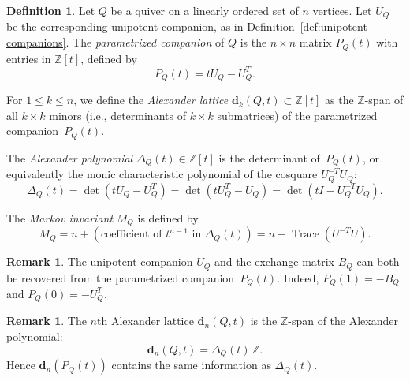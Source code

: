 \documentclass[11pt, letterpaper]{amsart}
\theoremstyle{definition}
\newtheorem{remark}[theorem]{Remark}
\newtheorem{definition}[theorem]{Definition}
\numberwithin{equation}{section}
\def\ZZ{{\mathbb Z}}
\def\dd{{\mathbf{d}}}
\begin{document}
\begin{definition}
\label{def:Ut}
Let $Q$ be a quiver on a linearly ordered set of $n$ vertices.
Let $U_Q$ be the corresponding unipotent companion, as in Definition~\ref{def:unipotent companions}. \linebreak[3]
The \emph{parametrized companion} of $Q$ is the $n \times n$ matrix $P_Q(t)$ 
with entries in $\ZZ[t]$, defined by 
\begin{equation*}
P_Q(t) = tU_Q - U_Q^T.
\end{equation*}

For $1\le k\le n$, we define the \emph{Alexander lattice} $\dd_k(Q,t)\subset\ZZ[t]$ as
the $\ZZ$-span of all $k \times k$ minors (i.e., determinants of $k \times k$ submatrices) of 
the parametrized companion~$P_Q(t)$.  

The \emph{Alexander polynomial}  $\Delta_Q(t)\in\ZZ[t]$ is the determinant of~$P_Q(t)$,
or equivalently the monic characteristic polynomial of the cosquare $U_Q^{-T}U_Q$:
\begin{equation}
\label{eq:delta-Q-char-poly}
\Delta_Q(t) = \det(tU_Q-U_Q^{T}) =\det(tU_Q^{T}-U_Q)=\det(tI-U_Q^{-T}U_Q).
\end{equation}

The \emph{Markov invariant} $M_Q$ %
is defined by
\begin{equation}
\label{eq:Markov-n}
M_Q=n+(\text{coefficient of $t^{n-1}$ in $\Delta_Q(t)$})=n-\operatorname{Trace}(U^{-T}U). 
\end{equation}
\end{definition}

\begin{remark}
The unipotent companion $U_Q$ and the exchange matrix $B_Q$ can both be recovered from the parametrized companion~$P_Q(t)$.  
Indeed, 
$P_Q(1) = - B_Q$ and $P_Q(0) = - U_Q^T$.
\end{remark}

\begin{remark}
\label{rem:d_n}
The $n$th Alexander lattice $\dd_n(Q,t)$ is the $\ZZ$-span of the Alexander polynomial:
\begin{equation}
\label{eq:d_n}
\dd_n(Q,t) = \Delta_Q(t)\, \ZZ . 
\end{equation}
Hence $\dd_n(P_Q(t))$ contains the same information as $\Delta_Q(t)$. 
\end{remark}
\end{document}
